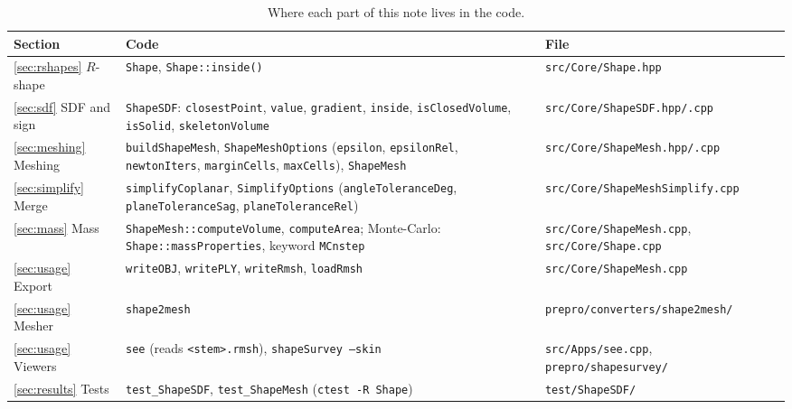\documentclass[11pt,a4paper]{article}
\newcommand{\code}[1]{\texttt{#1}}
\begin{document}
\begin{table}[tb]
  \centering
  \small
  \caption{Where each part of this note lives in the code.}
  \label{tab:codemap}
  \begin{tabularx}{\linewidth}{@{}l>{\raggedright\arraybackslash}X>{\raggedright\arraybackslash}X@{}}
    \toprule
    Section & Code & File \\
    \midrule
    \ref{sec:rshapes} $R$-shape & \code{Shape}, \code{Shape::inside()} & \code{src/Core/Shape.hpp} \\
    \ref{sec:sdf} SDF and sign & \code{ShapeSDF}: \code{closestPoint}, \code{value},
      \code{gradient}, \code{inside}, \code{isClosedVolume}, \code{isSolid},
      \code{skeletonVolume} & \code{src/Core/ShapeSDF.hpp/.cpp} \\
    \ref{sec:meshing} Meshing & \code{buildShapeMesh}, \code{ShapeMeshOptions}
      (\code{epsilon}, \code{epsilonRel}, \code{newtonIters}, \code{marginCells},
      \code{maxCells}), \code{ShapeMesh} & \code{src/Core/ShapeMesh.hpp/.cpp} \\
    \ref{sec:simplify} Merge & \code{simplifyCoplanar}, \code{SimplifyOptions}
      (\code{angleToleranceDeg}, \code{planeToleranceSag}, \code{planeToleranceRel})
      & \code{src/Core/ShapeMeshSimplify.cpp} \\
    \ref{sec:mass} Mass & \code{ShapeMesh::computeVolume}, \code{computeArea};
      Monte-Carlo: \code{Shape::massProperties}, keyword \code{MCnstep}
      & \code{src/Core/ShapeMesh.cpp}, \code{src/Core/Shape.cpp} \\
    \ref{sec:usage} Export & \code{writeOBJ}, \code{writePLY}, \code{writeRmsh},
      \code{loadRmsh} & \code{src/Core/ShapeMesh.cpp} \\
    \ref{sec:usage} Mesher & \code{shape2mesh} & \code{prepro/converters/shape2mesh/} \\
    \ref{sec:usage} Viewers & \code{see} (reads \code{<stem>.rmsh}),
      \code{shapeSurvey --skin} & \code{src/Apps/see.cpp},
      \code{prepro/shapesurvey/} \\
    \ref{sec:results} Tests & \code{test\_ShapeSDF}, \code{test\_ShapeMesh}
      (\code{ctest -R Shape}) & \code{test/ShapeSDF/} \\
    \bottomrule
  \end{tabularx}
\end{table}
\end{document}
